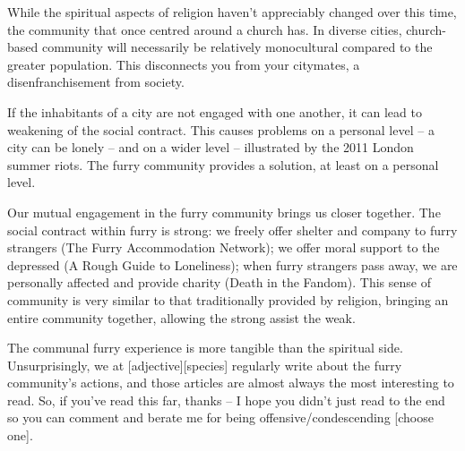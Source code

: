 While the spiritual aspects of religion haven't appreciably changed over this time, the community that once centred around a church has. In diverse cities, church-based community will necessarily be relatively monocultural compared to the greater population. This disconnects you from your citymates, a disenfranchisement from society.

If the inhabitants of a city are not engaged with one another, it can lead to weakening of the social contract. This causes problems on a personal level -- a city can be lonely -- and on a wider level -- illustrated by the 2011 London summer riots. The furry community provides a solution, at least on a personal level.

Our mutual engagement in the furry community brings us closer together. The social contract within furry is strong: we freely offer shelter and company to furry strangers (The Furry Accommodation Network); we offer moral support to the depressed (A Rough Guide to Loneliness); when furry strangers pass away, we are personally affected and provide charity (Death in the Fandom). This sense of community is very similar to that traditionally provided by religion, bringing an entire community together, allowing the strong assist the weak.

The communal furry experience is more tangible than the spiritual side. Unsurprisingly, we at [adjective][species] regularly write about the furry community's actions, and those articles are almost always the most interesting to read. So, if you've read this far, thanks -- I hope you didn't just read to the end so you can comment and berate me for being offensive/condescending [choose one].
